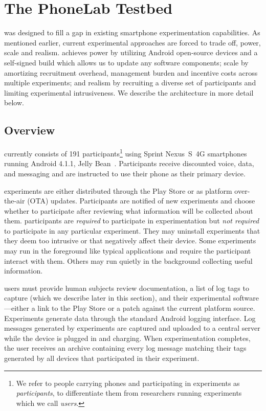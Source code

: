 \section{The PhoneLab Testbed}
\label{sec-testbed}

\PhoneLab{} was designed to fill a gap in existing smartphone experimentation
capabilities. As mentioned earlier, current experimental approaches are
forced to trade off, power, scale and realism. \PhoneLab{} achieves power by
utilizing Android open-source devices and a self-signed build which allows us
to update any software components; scale by amortizing recruitment overhead,
management burden and incentive costs across multiple experiments; and
realism by recruiting a diverse set of participants and limiting experimental
intrusiveness. We describe the architecture \PhoneLab{} in more detail below.

\subsection{Overview}

\PhoneLab{} currently consists of 191 participants\footnote{We refer to
people carrying \PhoneLab{} phones and participating in experiments as
\PhoneLab{} \textit{participants}, to differentiate them from researchers
running \PhoneLab{} experiments which we call \textit{users}.} using Sprint
Nexus~S~4G smartphones~\cite{nexuss4g} running Android 4.1.1, Jelly
Bean~\cite{jellybean}. Participants receive discounted voice, data,
and messaging and are instructed to use their \PhoneLab{} phone as their
primary device.

\PhoneLab{} experiments are either distributed through the Play Store or as
platform over-the-air (OTA) updates. Participants are notified of new
experiments and choose whether to participate after reviewing what
information will be collected about them. \PhoneLab{} participants are
\textit{required} to participate in experimentation but \textit{not required}
to participate in any particular experiment. They may uninstall experiments
that they deem too intrusive or that negatively affect their device. Some
experiments may run in the foreground like typical applications and require
the participant interact with them. Others may run quietly in the background
collecting useful information. 

\PhoneLab{} users must provide human subjects review documentation, a list of
log tags to capture (which we describe later in this section), and their
experimental software---either a link to the Play Store or a patch against the
current \PhoneLab{} platform source.  Experiments generate data through the
standard Android logging interface. Log messages generated by \PhoneLab{}
experiments are captured and uploaded to a central server while the device is
plugged in and charging. When experimentation completes, the user receives an
archive containing every log message matching their tags generated by all
\PhoneLab{} devices that participated in their experiment.

